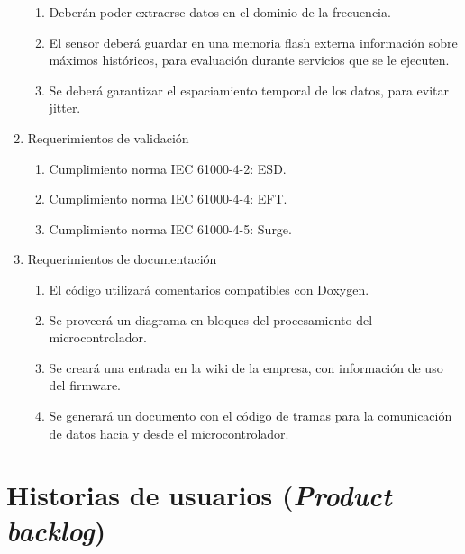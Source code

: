 \documentclass[11pt]{charter}
\begin{document}
\begin{enumerate}
\begin{enumerate}
	\item Deberán poder extraerse datos en el dominio de la frecuencia.
	\item El sensor deberá guardar en una memoria flash externa información sobre máximos históricos, para evaluación durante servicios que se le ejecuten.
	\item Se deberá garantizar el espaciamiento temporal de los datos, para evitar jitter.
	\end{enumerate}
\item Requerimientos de validación
	\begin{enumerate}
	\item Cumplimiento norma IEC 61000-4-2: ESD.
	\item Cumplimiento norma IEC 61000-4-4: EFT.
	\item Cumplimiento norma IEC 61000-4-5: Surge.
	\end{enumerate}
\item Requerimientos de documentación
	\begin{enumerate}
	\item El código utilizará comentarios compatibles con Doxygen.
	\item Se proveerá un diagrama en bloques del procesamiento del microcontrolador.
	\item Se creará una entrada en la wiki de la empresa, con información de uso del firmware.
	\item Se generará un documento con el código de tramas para la comunicación de datos hacia y desde el microcontrolador.
	\end{enumerate}
\end{enumerate}


\section{Historias de usuarios (\textit{Product backlog})}
\label{sec:backlog}
\end{document}
